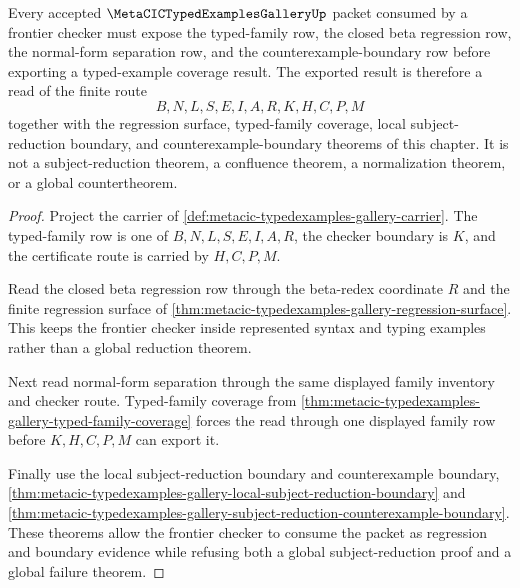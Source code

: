 \begin{theorem}
\label{thm:metacic-typed-examples-gallery-frontier-coverage}
Every accepted $\MetaCICTypedExamplesGalleryUp$ packet consumed by a frontier checker must expose the typed-family row, the closed beta regression row, the normal-form separation row, and the counterexample-boundary row before exporting a typed-example coverage result. The exported result is therefore a read of the finite route
$$
B,N,L,S,E,I,A,R,K,H,C,P,M
$$
together with the regression surface, typed-family coverage, local subject-reduction boundary, and counterexample-boundary theorems of this chapter. It is not a subject-reduction theorem, a confluence theorem, a normalization theorem, or a global countertheorem.
\end{theorem}
\begin{proof}
Project the carrier of \autoref{def:metacic-typedexamples-gallery-carrier}. The typed-family row is one of $B,N,L,S,E,I,A,R$, the checker boundary is $K$, and the certificate route is carried by $H,C,P,M$.

Read the closed beta regression row through the beta-redex coordinate $R$ and the finite regression surface of \autoref{thm:metacic-typedexamples-gallery-regression-surface}. This keeps the frontier checker inside represented syntax and typing examples rather than a global reduction theorem.

Next read normal-form separation through the same displayed family inventory and checker route. Typed-family coverage from \autoref{thm:metacic-typedexamples-gallery-typed-family-coverage} forces the read through one displayed family row before $K,H,C,P,M$ can export it.

Finally use the local subject-reduction boundary and counterexample boundary, \autoref{thm:metacic-typedexamples-gallery-local-subject-reduction-boundary} and \autoref{thm:metacic-typedexamples-gallery-subject-reduction-counterexample-boundary}. These theorems allow the frontier checker to consume the packet as regression and boundary evidence while refusing both a global subject-reduction proof and a global failure theorem.
\end{proof}

